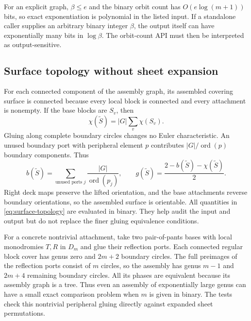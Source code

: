 For an explicit graph, $\beta\leq e$ and the binary orbit count has
$O(e\log(m+1))$ bits, so exact exponentiation is polynomial in the listed
input. If a standalone caller supplies an arbitrary binary integer $\beta$,
the output itself can have exponentially many bits in $\log\beta$.
The orbit-count API must then be interpreted as output-sensitive.

\subsection{Surface topology without sheet expansion}

For each connected component of the assembly graph, its assembled covering
surface is connected because every local block is connected and every
attachment is nonempty. If the base blocks are $S_v$, then
\[
 \chi(\widetilde S)=|G|\sum_v\chi(S_v).
\]
Gluing along complete boundary circles changes no Euler characteristic.
An unused boundary port with peripheral element $p$ contributes
$|G|/\operatorname{ord}(p)$ boundary components. Thus
\begin{equation}
 b(\widetilde S)=\sum_{\text{unused ports }j}
     \frac{|G|}{\operatorname{ord}(p_j)},\qquad
 g(\widetilde S)=\frac{2-b(\widetilde S)-\chi(\widetilde S)}2.
 \label{eq:surface-topology}
\end{equation}
Right deck maps preserve the lifted orientation, and the base attachments
reverse boundary orientations, so the assembled surface is orientable.
All quantities in \eqref{eq:surface-topology} are evaluated in binary. They help audit the input
and output but do not replace the finer gluing equivalence conditions.

For a concrete nontrivial attachment, take two pair-of-pants bases with
local monodromies $T,R$ in $D_m$ and glue their reflection ports. Each
connected regular block cover has genus zero and $2m+2$ boundary circles.
The full preimages of the reflection ports consist of $m$ circles, so
the assembly has genus $m-1$ and $2m+4$ remaining boundary circles.
All its phases are equivalent because its assembly graph is a tree.
Thus even an assembly of exponentially large genus can have a small
exact comparison problem when $m$ is given in binary. The tests check this
nontrivial peripheral gluing directly against expanded sheet permutations.
